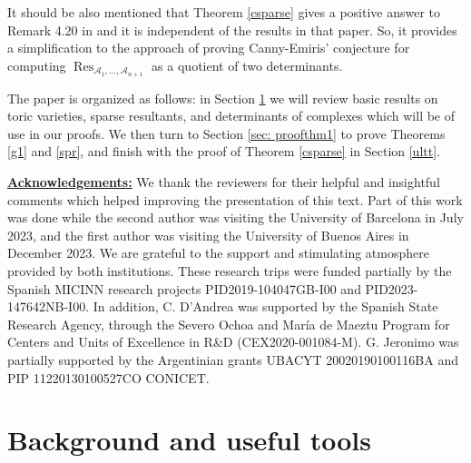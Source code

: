 \documentclass[a4paper,11pt]{amsart}
\newcommand{\Res}{\operatorname{Res}}
\newcommand{\cA}{{\mathcal A}}
\newcounter{thm}
\numberwithin{thm}{section}
\numberwithin{equation}{section}
\theoremstyle{definition}
\theoremstyle{plain}
\begin{document}
It should be also mentioned that Theorem \ref{csparse} gives a positive answer to Remark 4.20 in \cite{DJS23} and it is independent of the results in that paper. So, it provides a simplification to the approach of proving Canny-Emiris' conjecture for computing $\Res_{\cA_1,\ldots, \cA_{n+1}}$ as a quotient of two determinants.

The paper is organized as follows: in Section \ref{crus} we will review basic results on toric varieties, sparse resultants, and determinants of complexes which will be of use in our proofs. We then turn to Section \ref{sec: proofthm1} to prove Theorems \ref{g1} and \ref{spr}, and finish with the proof of Theorem \ref{csparse} in Section \ref{ultt}.

\bigskip
\noindent\underline{\bf Acknowledgements:}
We thank the reviewers for their helpful and insightful comments which helped improving the presentation of this text.
Part of this work was done while the second author was visiting the University of Barcelona in July 2023, and the first author was visiting the University of Buenos Aires in December 2023. We are grateful to the support and stimulating atmosphere provided by both institutions. These research trips were funded partially by the Spanish MICINN research projects  PID2019-104047GB-I00 and PID2023-147642NB-I00. In addition, C. D'Andrea was supported by the Spanish State Research Agency, through the Severo Ochoa and Mar\'ia de Maeztu Program for Centers and Units of Excellence in R\&D (CEX2020-001084-M).
G. Jeronimo was partially supported by the Argentinian grants UBACYT 20020190100116BA and PIP 11220130100527CO CONICET.

\bigskip
\section{Background and useful tools}\label{crus}
\end{document}
